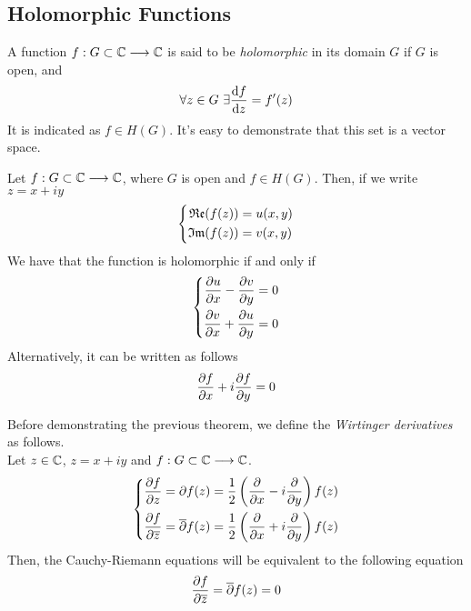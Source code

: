 \documentclass[../complete.tex]{subfiles}
\begin{document}
\subsection{Holomorphic Functions}
\begin{dfn}
	A function $f:G\subset\mathbb{C}\overset{}{\longrightarrow}\mathbb{C}$ is said to be \textit{holomorphic} in its domain $G$ if $G$ is open, and
	\begin{equation}
		\forall{z}\in G\ \exists\derivative{f}{z}=f'(z)
		\label{eq:holomorphicfc}
	\end{equation}
	It is indicated as $f\in H(G)$. It's easy to demonstrate that this set is a vector space.
\end{dfn}
\begin{thm}
	Let $f:G\subset\mathbb{C}\overset{}{\longrightarrow}\mathbb{C}$, where $G$ is open and $f\in H(G)$. Then, if we write $z=x+iy$
	\begin{equation}
		\left\{ \begin{aligned}
				\mathfrak{Re}{(f(z))}&=u(x,y)\\
				\mathfrak{Im}{(f(z))}&=v(x,y)
		\end{aligned}\right.
		\label{eq:defnrealimf}
	\end{equation}
	We have that the function is holomorphic if and only if
	\begin{equation}
		\left\{ \begin{aligned}
				\pdv{u}{x}-\pdv{v}{y}&=0\\
				\pdv{v}{x}+\pdv{u}{y}&=0
		\end{aligned}\right.
		\label{eq:cauchyriemann}
	\end{equation}
	Alternatively, it can be written as follows
	\begin{equation}
		\pdv{f}{x}+i\pdv{f}{y}=0
		\label{eq:wirtingercr}
	\end{equation}
\end{thm}
\begin{dfn}
	Before demonstrating the previous theorem, we define the \textit{Wirtinger derivatives} as follows.\\
	Let $z\in\mathbb{C}$, $z=x+iy$ and $f:G\subset\mathbb{C}\overset{}{\longrightarrow}\mathbb{C}$.
	\begin{equation}
		\left\{ \begin{aligned}
				\pdv{f}{z}=\partial f(z)&=\frac{1}{2}\left( \pdv{x}-i\pdv{y} \right)f(z)\\
				\pdv{f}{\ensuremath{\overline{z}}}=\overline{\partial} f(z)&=\frac{1}{2}\left( \pdv{x}+i\pdv{y} \right)f(z)
		\end{aligned}\right.
		\label{eq:wirtingerder}
	\end{equation}
	Then, the Cauchy-Riemann equations will be equivalent to the following equation
	\begin{equation}
		\pdv{f}{\ensuremath{\overline{z}}}=\overline{\partial}{f(z)}=0
		\label{eq:crwirtinger}
	\end{equation}
\end{dfn}
\end{document}
